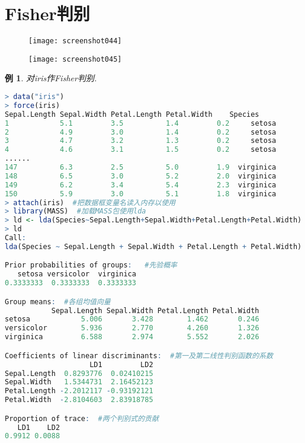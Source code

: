 \documentclass[11pt,a4paper,oneside]{book}
\newtheorem{e}{例}
\begin{document}
\section{Fisher判别}
\begin{figure}[H]
	\centering
	\texttt{[image: screenshot044]}
\end{figure}
\begin{figure}[H]
	\centering
	\texttt{[image: screenshot045]}
\end{figure}
\begin{e}
	对iris作Fisher判别.
\end{e}
\begin{lstlisting}[language=r]
> data("iris")
> force(iris)
Sepal.Length Sepal.Width Petal.Length Petal.Width    Species
1            5.1         3.5          1.4         0.2     setosa
2            4.9         3.0          1.4         0.2     setosa
3            4.7         3.2          1.3         0.2     setosa
4            4.6         3.1          1.5         0.2     setosa
......
147          6.3         2.5          5.0         1.9  virginica
148          6.5         3.0          5.2         2.0  virginica
149          6.2         3.4          5.4         2.3  virginica
150          5.9         3.0          5.1         1.8  virginica
> attach(iris)  #把数据框变量名读入内存以使用
> library(MASS)  #加载MASS包使用lda
> ld <- lda(Species~Sepal.Length+Sepal.Width+Petal.Length+Petal.Width)
> ld
Call:
lda(Species ~ Sepal.Length + Sepal.Width + Petal.Length + Petal.Width)  #公式

Prior probabilities of groups:   #先验概率
   setosa versicolor  virginica 
0.3333333  0.3333333  0.3333333 

Group means:  #各组均值向量
           Sepal.Length Sepal.Width Petal.Length Petal.Width
setosa            5.006       3.428        1.462       0.246
versicolor        5.936       2.770        4.260       1.326
virginica         6.588       2.974        5.552       2.026

Coefficients of linear discriminants:  #第一及第二线性判别函数的系数
                    LD1         LD2
Sepal.Length  0.8293776  0.02410215
Sepal.Width   1.5344731  2.16452123
Petal.Length -2.2012117 -0.93192121
Petal.Width  -2.8104603  2.83918785

Proportion of trace:  #两个判别式的贡献
   LD1    LD2 
0.9912 0.0088 
\end{lstlisting}
\end{document}
